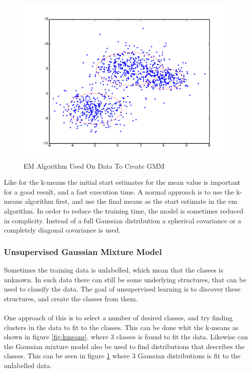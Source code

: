 \begin{figure}[H]
\centering
\includegraphics[scale=0.5]{billeder/UGMM}
\caption{EM Algorithm Used On Data To Create GMM}
\label{fig:UGMM}
\end{figure}

Like for the k-means the initial start estimates for the mean value is important for a good result, and a fast execution time. A normal approach is to use the k-means algorithm first, and use the final means as the start estimate in the em algorithm. In order to reduce the training time, the model is sometimes reduced in complicity. Instead of a full Gaussian distribution a spherical covariance or a completely diagonal covariance is used. 

\subsubsection{Unsupervised Gaussian Mixture Model}
Sometimes the training data is unlabelled, which mean that the classes is unknown. In such data there can still be some underlying structures, that can be used to classify the data. The goal of unsupervised learning is to discover these structures, and create the classes from them. \\ \ \\
One approach of this is to select a number of desired classes, and try finding clusters in the data to fit to the classes. This can be done whit the k-means as shown in figure \ref{fig:kmeans}.  where 3 classes is found to fit the data. Likewise can the Gaussian mixture model also be used to find distributions that describes the classes. This can be seen in figure \ref{fig:UGMM} where 3 Gaussian distributions is fit to the unlabelled data. \\ \ \\

